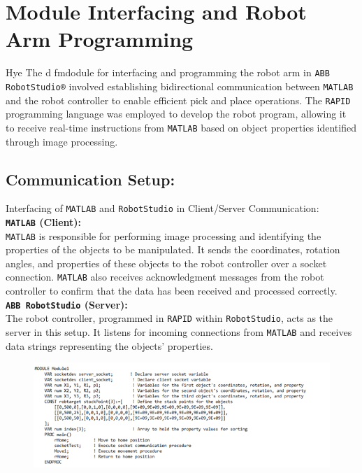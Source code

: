 \newpage
\section{Module Interfacing and Robot Arm Programming}
Hye The d fmdodule for interfacing and programming the robot arm in \texttt{ABB RobotStudio®} involved establishing bidirectional communication between \texttt{MATLAB} and the robot controller to enable efficient pick and place operations. The \texttt{RAPID} programming language was employed to develop the robot program, allowing it to receive real-time instructions from \texttt{MATLAB} based on object properties identified through image processing.

\subsection{Communication Setup:}
Interfacing of \texttt{MATLAB} and \texttt{RobotStudio} in Client/Server Communication: \\ 
\noindent \textbf{\texttt{MATLAB} (Client):} \\
\texttt{MATLAB} is responsible for performing image processing and identifying the properties of the objects to be manipulated. It sends the coordinates, rotation angles, and properties of these objects to the robot controller over a socket connection. \texttt{MATLAB} also receives acknowledgment messages from the robot controller to confirm that the data has been received and processed correctly. \\
\noindent \textbf{\texttt{ABB RobotStudio} (Server):} \\
The robot controller, programmed in \texttt{RAPID} within \texttt{RobotStudio}, acts as the server in this setup. It listens for incoming connections from \texttt{MATLAB} and receives data strings representing the objects' properties.

\begin{figure}[H]
    \includegraphics[width=7.4in ]{pics/abbstud.png}
    \label{abrrr}
\end{figure}

